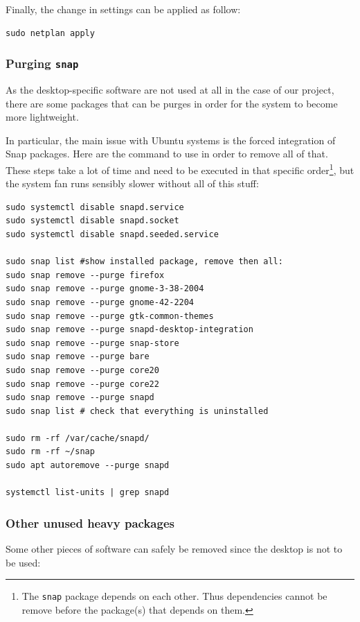 \documentclass[10pt]{article}
\begin{document}
Finally, the change in settings can be applied
as follow:

\begin{verbatim}
sudo netplan apply
\end{verbatim}

\subsubsection{Purging \texttt{snap}}
\label{sec:org942ade3}
As the desktop-specific software are not used at all in the case
of our project, there are some packages that can be purges in order for the
system to become more lightweight.

In particular, the main issue with Ubuntu systems is the forced integration of
Snap packages. Here are the command to use in order to remove all of that.
These steps take a lot of time and need to be executed in that specific order\footnote{The \texttt{snap} package depends on each other. Thus dependencies
cannot be remove before the package(s) that depends on them.},
but the system fan runs sensibly slower without all of this stuff:

\begin{verbatim}
sudo systemctl disable snapd.service
sudo systemctl disable snapd.socket
sudo systemctl disable snapd.seeded.service

sudo snap list #show installed package, remove then all:
sudo snap remove --purge firefox
sudo snap remove --purge gnome-3-38-2004
sudo snap remove --purge gnome-42-2204
sudo snap remove --purge gtk-common-themes
sudo snap remove --purge snapd-desktop-integration
sudo snap remove --purge snap-store
sudo snap remove --purge bare
sudo snap remove --purge core20
sudo snap remove --purge core22
sudo snap remove --purge snapd
sudo snap list # check that everything is uninstalled

sudo rm -rf /var/cache/snapd/
sudo rm -rf ~/snap
sudo apt autoremove --purge snapd

systemctl list-units | grep snapd
\end{verbatim}

\subsubsection{Other unused heavy packages}
\label{sec:org7fac80b}
Some other pieces of software can safely be removed since the desktop is
not to be used:
\end{document}
